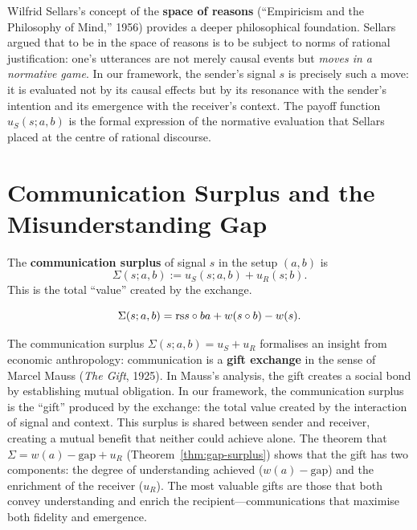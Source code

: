 \begin{interpretation}
Wilfrid Sellars's concept of the \textbf{space of reasons} (``Empiricism and
the Philosophy of Mind,'' 1956) provides a deeper philosophical foundation.
Sellars argued that to be in the space of reasons is to be subject to norms
of rational justification: one's utterances are not merely causal events but
\emph{moves in a normative game}.  In our framework, the sender's signal
$s$ is precisely such a move: it is evaluated not by its causal effects but
by its resonance with the sender's intention and its emergence with the
receiver's context.  The payoff function $u_S(s; a, b)$ is the formal
expression of the normative evaluation that Sellars placed at the centre of
rational discourse.
\end{interpretation}



\section{Communication Surplus and the Misunderstanding Gap}

\begin{definition}
\label{def:surplus}
The \textbf{communication surplus} of signal $s$ in the setup $(a, b)$ is
\[
  \Sigma(s; a, b) := u_S(s; a, b) + u_R(s; b).
\]
This is the total ``value'' created by the exchange.
\end{definition}

\begin{proposition}
\label{prop:surplus-decomp}
\[
  \Sigma(s; a, b) = \mathrm{rs}{s \circ b}{a} + w(s \circ b) - w(s).
\]
\end{proposition}

\begin{remark}
\label{rem:ch13:surplus_gift_economy}
The communication surplus $\Sigma(s; a, b) = u_S + u_R$ formalises an
insight from economic anthropology: communication is a \textbf{gift
exchange} in the sense of Marcel Mauss (\emph{The Gift}, 1925).  In Mauss's
analysis, the gift creates a social bond by establishing mutual obligation.
In our framework, the communication surplus is the ``gift'' produced by the
exchange: the total value created by the interaction of signal and context.
This surplus is shared between sender and receiver, creating a mutual
benefit that neither could achieve alone.  The theorem that $\Sigma =
w(a) - \mathrm{gap} + u_R$ (Theorem~\ref{thm:gap-surplus}) shows that
the gift has two components: the degree of understanding achieved
($w(a) - \mathrm{gap}$) and the enrichment of the receiver ($u_R$).  The
most valuable gifts are those that both convey understanding and enrich
the recipient---communications that maximise both fidelity and emergence.
\end{remark}



